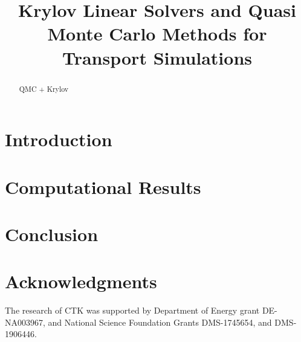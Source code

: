 \documentclass{nseJournal}
\begin{document}
\title{Krylov Linear Solvers and Quasi Monte Carlo
Methods for Transport Simulations}


{}


\titlePage

\begin{abstract}
QMC + Krylov
\end{abstract}


\section{Introduction}


\section{Computational Results}
\label{sec:results}



\section{Conclusion}
\label{sec:conclusion}


\pagebreak
\section*{Acknowledgments}

The research of CTK was supported by 
Department of Energy grant DE-NA003967,
%
and National Science Foundation Grants
DMS-1745654,
and
DMS-1906446.


\pagebreak

\end{document}
